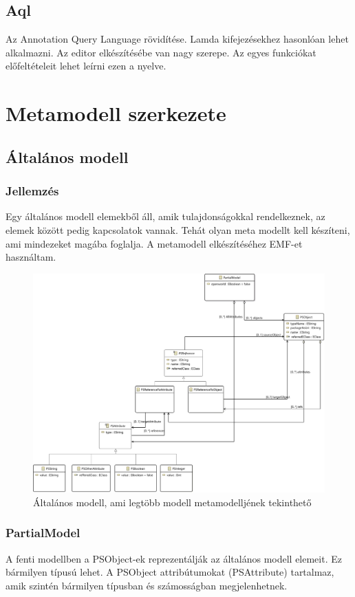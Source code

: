 \subsection{Aql}
Az Annotation Query Language rövidítése. Lamda kifejezésekhez hasonlóan lehet alkalmazni. Az editor elkészítésébe van nagy szerepe. Az egyes funkciókat előfeltételeit lehet leírni ezen a nyelve. 

\section{Metamodell szerkezete}

\subsection{Általános modell}

\subsubsection{Jellemzés}
Egy általános modell elemekből áll, amik tulajdonságokkal rendelkeznek, az elemek között pedig kapcsolatok vannak. Tehát olyan meta modellt kell készíteni, ami mindezeket magába foglalja. A metamodell elkészítéséhez EMF-et használtam.

\begin{figure}[!ht]
	\centering
	\includegraphics[width=150mm]{figures/partialmodel01.pdf}
	\caption{Általános modell, ami legtöbb modell metamodelljének tekinthető} 
\end{figure}

\subsubsection{PartialModel}
A fenti modellben a PSObject-ek reprezentálják az általános modell elemeit. Ez bármilyen típusú lehet. A PSObject attribútumokat (PSAttribute) tartalmaz, amik szintén bármilyen típusban és számosságban megjelenhetnek. 


